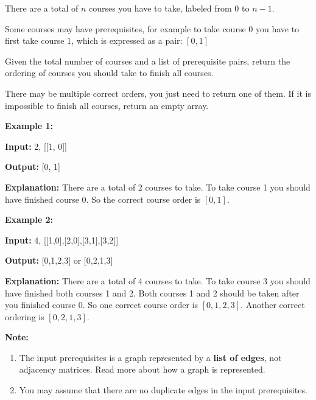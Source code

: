 \documentclass[a4paper]{article}
\begin{document}
There are a total of $n$ courses you have to take, labeled from $0$ to $n-1$.

Some courses may have prerequisites, for example to take course $0$ you have to first take course $1$, which is expressed as a pair: $[0,1]$

Given the total number of courses and a list of prerequisite pairs, return the ordering of courses you should take to finish all courses.

There may be multiple correct orders, you just need to return one of them. If it is impossible to finish all courses, return an empty array.


\SPACE

\textbf{Example 1:}

\textbf{Input:} 2, [[1, 0]]

\textbf{Output:} [0, 1]

\textbf{Explanation:} There are a total of $2$ courses to take. To take course 1 you should have finished course $0$. So the correct course order is $[0,1]$.

\SPACE


\textbf{Example 2:}

\textbf{Input:} 4, [[1,0],[2,0],[3,1],[3,2]]

\textbf{Output:} [0,1,2,3] or [0,2,1,3]

\textbf{Explanation:} There are a total of 4 courses to take. To take course 3 you should have finished both    courses 1 and 2. Both courses 1 and 2 should be taken after you finished course 0. So one correct course order is $[0,1,2,3]$. Another correct ordering is $[0,2,1,3]$.

\SPACE

\textbf{Note:}
\begin{enumerate}
\item The input prerequisites is a graph represented by a \textbf{list of edges}, not adjacency matrices. Read more about how a graph is represented.
\item You may assume that there are no duplicate edges in the input prerequisites.
\end{enumerate}
\end{document}

